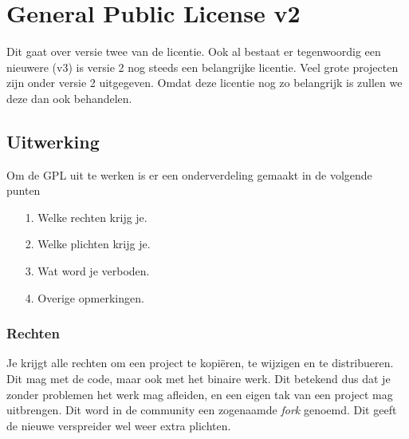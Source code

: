 %
%
%
%

\chapter{General Public License v2}\label{app.gpl}
Dit gaat over versie twee van de licentie. Ook al bestaat er tegenwoordig een nieuwere (v3) is versie 2 nog steeds een belangrijke licentie. Veel grote projecten zijn onder versie 2 uitgegeven. Omdat deze licentie nog zo belangrijk is zullen we deze dan ook behandelen. 

\section{Uitwerking}
Om de GPL uit te werken is er een onderverdeling gemaakt in de volgende punten
\begin{itemize}
  \item[1.] Welke rechten krijg je.
  \item[2.] Welke plichten krijg je.
  \item[3.] Wat word je verboden.
  \item[4.] Overige opmerkingen.
\end{itemize}

\subsection{Rechten}
Je krijgt alle rechten om een project te kopi\"{e}ren, te wijzigen en te distribueren. Dit mag met de code, maar ook met het binaire werk. Dit betekend dus dat je zonder problemen het werk mag afleiden, en een eigen tak van een project mag uitbrengen. Dit word in de community een zogenaamde \emph{fork} genoemd. Dit geeft de nieuwe verspreider wel weer extra plichten. 

